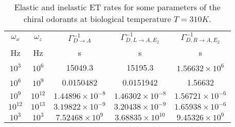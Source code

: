\documentclass[aps,prl,tightenlines,onecolumn,superscriptaddress]{revtex4}
\begin{document}
\begin{table}[H]
  \begin{center}
  \def\arraystretch{1.2}
  \caption{Elastic and inelastic ET rates for some parameters of the chiral odorants at biological temperature $T=310K$.}
  \begin{tabular} {|c|c|c|c|c|}
  \hline
   $\omega_{x}$ &\hspace{1cm}$\omega_{z}$ &\hspace{1cm} $\Gamma_{D\rightarrow A}^{-1}$ &\hspace{1cm} $\Gamma_{D,L\rightarrow A,E_{2}}^{-1}$ &\hspace{1cm} $\Gamma_{D,R\rightarrow A,E_{2}}^{-1}$ \\
  Hz &\hspace{1cm} Hz &\hspace{1cm} s &\hspace{1cm} s &\hspace{1cm} s \\
  \hline
  \hline
  $10^{3}$ &\hspace{1cm} $10^{6}$ &\hspace{1cm} 15049.3 &\hspace{1cm} 15195.3 &\hspace{1cm} $1.56632\times10^{6}$ \\
  \hline
  $10^{6}$ &\hspace{1cm} $10^{9}$ &\hspace{1cm} 0.0150482 &\hspace{1cm} 0.0151942 &\hspace{1cm} 1.56632 \\
  \hline
  $10^{9}$ &\hspace{1cm} $10^{12}$ &\hspace{1cm} $1.44896\times10^{-8}$ &\hspace{1cm} $1.46302\times10^{-8}$ &\hspace{1cm} $1.56721\times10^{-6}$ \\
  \hline
  $10^{12}$ &\hspace{1cm} $10^{13}$ &\hspace{1cm} $3.19822\times10^{-9}$ &\hspace{1cm} $3.20438\times10^{-9}$ &\hspace{1cm} $1.65938\times10^{-6}$ \\
  \hline
  \hline
  $10^{3}$ &\hspace{1cm} $10^{3}$ &\hspace{1cm} $7.52468\times10^{9}$ &\hspace{1cm} $3.68835\times10^{10}$ &\hspace{1cm} $9.45326\times10^9$ \\

\end{tabular}
\end{center}
\end{table}
\end{document}
